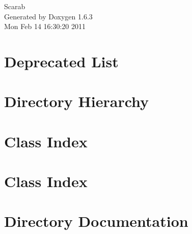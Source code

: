 \documentclass[a4paper]{book}
\begin{document}
\hypersetup{pageanchor=false}
\begin{titlepage}
\vspace*{7cm}
\begin{center}
{\Large Scarab }\\
\vspace*{1cm}
{\large Generated by Doxygen 1.6.3}\\
\vspace*{0.5cm}
{\small Mon Feb 14 16:30:20 2011}\\
\end{center}
\end{titlepage}
\clearemptydoublepage
{}
\tableofcontents
\clearemptydoublepage
{}
\hypersetup{pageanchor=true}
\chapter{Deprecated List}
\label{deprecated}
\hypertarget{deprecated}{}

\chapter{Directory Hierarchy}

\chapter{Class Index}

\chapter{Class Index}

\chapter{Directory Documentation}










\end{document}
